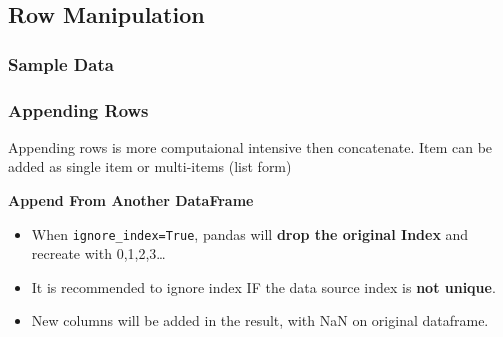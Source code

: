 \documentclass[
]{book}
\providecommand{\tightlist}{%
  \setlength{\itemsep}{0pt}\setlength{\parskip}{0pt}}
\begin{document}
\hypertarget{row-manipulation}{%
\subsection{Row Manipulation}\label{row-manipulation}}

\hypertarget{sample-data-9}{%
\subsubsection{Sample Data}\label{sample-data-9}}

\hypertarget{appending-rows}{%
\subsubsection{Appending Rows}\label{appending-rows}}

Appending rows is more computaional intensive then concatenate. Item can be added as single item or multi-items (list form)

\textbf{Append From Another DataFrame}

\begin{itemize}
\tightlist
\item
  When \texttt{ignore\_index=True}, pandas will \textbf{drop the original Index} and recreate with 0,1,2,3\ldots{}\\
\item
  It is recommended to ignore index IF the data source index is \textbf{not unique}.\\
\item
  New columns will be added in the result, with NaN on original dataframe.
\end{itemize}
\end{document}
